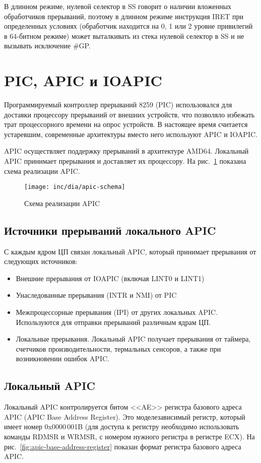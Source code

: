 В длинном режиме, нулевой селектор в SS говорит о наличии вложенных обработчиков прерываний, поэтому
в длинном режиме инструкция IRET при определенных условиях (обработчик находится на 0, 1 или 2 уровне
привилегий в 64-битном режиме) может выталкивать из стека нулевой селектор в SS и не вызывать исключение \#GP.



\section{PIC, APIC и IOAPIC}
\label{sec:apic_ioapic}
Программируемый контроллер прерываний 8259 (PIC) использовался для доставки процессору прерываний
от внешних устройств, что позволяло избежать трат процессорного времени на опрос устройств.
В настоящее время считается устаревшим, современные архитектуры вместо него используют APIC и IOAPIC.

APIC осуществляет поддержку прерываний в архитектуре AMD64. Локальный APIC принимает прерывания и
доставляет их процессору. На рис.~\ref{fig:apic-schema} показана схема реализации APIC.

\begin{figure}[ht!]
  \centering
  \texttt{[image: inc/dia/apic-schema]}
  \caption{Схема реализации APIC}
  \label{fig:apic-schema}
\end{figure}

\subsection{Источники прерываний локального APIC}
С каждым ядром ЦП связан локальный APIC, который принимает прерывания от следующих источников:
\begin{itemize}
	\item Внешние прерывания от IOAPIC (включая LINT0 и LINT1)
	\item Унаследованные прерывания (INTR и NMI) от PIC
	\item Межпроцессорные прерывания (IPI) от других локальных APIC. Используются
		для отправки прерываний различным ядрам ЦП.
	\item Локальные прерывания. Локальный APIC получает прерывания от таймера,
		счетчиков производительности, термальных сенсоров, а также при возникновении
		ошибок APIC.
\end{itemize}

\subsection{Локальный APIC}
Локальный APIC контролируется битом <<AE>> регистра базового адреса APIC (APIC Base Address Register).
Это моделезависимый регистр, который имеет номер 0x0000\,001B (для доступа к регистру необходимо
использовать команды RDMSR и WRMSR, с номером нужного регистра в регистре ECX).
На рис.~\ref{fig:apic-base-address-register} показан формат регистра базового адреса APIC.

